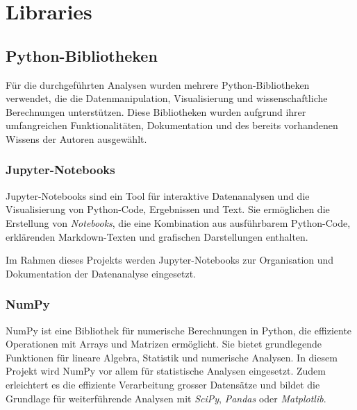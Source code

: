 

\chapter{Libraries} %

\label{AppendixA} %


\section{Python-Bibliotheken}
Für die durchgeführten Analysen wurden mehrere Python-Bibliotheken verwendet, die die Datenmanipulation, Visualisierung und wissenschaftliche Berechnungen unterstützen. Diese Bibliotheken wurden aufgrund ihrer umfangreichen Funktionalitäten, Dokumentation und des bereits vorhandenen Wissens der Autoren ausgewählt. 


\subsection{Jupyter-Notebooks}  
Jupyter-Notebooks sind ein Tool für interaktive Datenanalysen und die Visualisierung von Python-Code, Ergebnissen und Text. Sie ermöglichen die Erstellung von \textit{Notebooks}, die eine Kombination aus ausführbarem Python-Code, erklärenden Mark\-down-Texten und grafischen Darstellungen enthalten. \parencite{noauthor_project_nodate} 

Im Rahmen dieses Projekts werden Jupyter-Notebooks zur Organisation und Dokumentation der Datenanalyse eingesetzt. 

\subsection{NumPy}
NumPy ist eine Bibliothek für numerische Berechnungen in Python, die effiziente Operationen mit Arrays und Matrizen ermöglicht. Sie bietet grundlegende Funktionen für lineare Algebra, Statistik und numerische Analysen. In diesem Projekt wird NumPy vor allem für statistische Analysen eingesetzt. Zudem erleichtert es die effiziente Verarbeitung grosser Datensätze und bildet die Grundlage für weiterführende Analysen mit \textit{SciPy}, \textit{Pandas} oder \textit{Matplotlib}. \parencite{noauthor_numpy_nodate}\parencite{noauthor_what_nodate}


